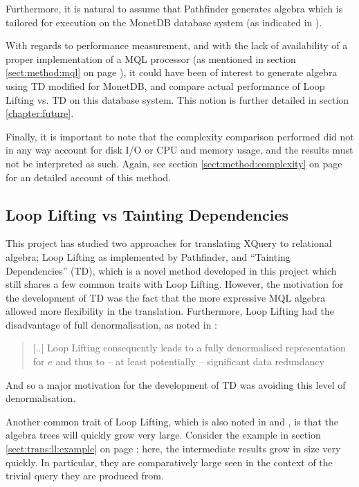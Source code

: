 Furthermore, it is natural to assume that Pathfinder generates algebra
which is tailored for execution on the MonetDB database system (as indicated
in \cite{pathfinder_purelyRelational}).

With regards to performance measurement, and with the lack of availability of a
proper implementation of a MQL processor (as mentioned in section
\ref{sect:method:mql} on page \pageref{sect:method:mql}), it could have been
of interest to generate algebra using TD modified for MonetDB, and compare
actual performance of Loop Lifting vs. TD on this database system. This notion
is further detailed in section \ref{chapter:future}.

Finally, it is important to note that the complexity comparison performed did
not in any way account for disk I/O or CPU and memory usage, and the results
must not be interpreted as such. Again, see section \ref{sect:method:complexity} on
page \pageref{sect:method:complexity} for an detailed account of this method.

\subsection{Loop Lifting vs Tainting Dependencies}
\label{sect:disc:llvsTD}
This project has studied two approaches for translating XQuery to relational
algebra; Loop Lifting as implemented by Pathfinder, and ``Tainting
Dependencies'' (TD), which is a novel method developed in this project which
still shares a few common traits with Loop Lifting. However, the motivation for
the development of TD was the fact that the more expressive MQL algebra allowed
more flexibility in the translation. Furthermore, Loop Lifting had the
disadvantage of full denormalisation, as noted in
\cite{pathfinder_purelyRelational}: 

\begin{quote}
[..] Loop Lifting consequently leads to a fully denormalised representation for
$e$ and thus to -- at least potentially -- significant data redundancy
\end{quote}

And so a major motivation for the development of TD was avoiding this level of
denormalisation.

Another common trait of Loop Lifting, which is also noted in
\cite{pathfinder_mothertongue} and \cite{pathfinder_purelyRelational}, is that
the algebra trees will quickly grow very large. Consider the example in section 
\ref{sect:trans:ll:example} on page \pageref{sect:trans:ll:example}; here, the
intermediate results grow in size very quickly. In particular, they are
comparatively large seen in the context of the trivial query they are produced
from.

